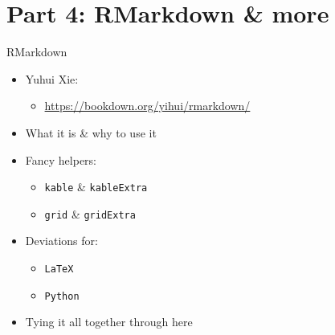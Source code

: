 \documentclass[
  ignorenonframetext,
]{beamer}
\providecommand{\tightlist}{%
  \setlength{\itemsep}{0pt}\setlength{\parskip}{0pt}}
\begin{document}
\hypertarget{part-4-rmarkdown-more}{%
\section{Part 4: RMarkdown \& more}\label{part-4-rmarkdown-more}}

\begin{frame}[fragile]{RMarkdown}
\protect\hypertarget{rmarkdown}{}

\begin{itemize}
\tightlist
\item
  Yuhui Xie:

  \begin{itemize}
  \tightlist
  \item
    \url{https://bookdown.org/yihui/rmarkdown/}
  \end{itemize}
\item
  What it is \& why to use it
\item
  Fancy helpers:

  \begin{itemize}
  \tightlist
  \item
    \texttt{kable} \& \texttt{kableExtra}
  \item
    \texttt{grid} \& \texttt{gridExtra}
  \end{itemize}
\item
  Deviations for:

  \begin{itemize}
  \tightlist
  \item
    \texttt{LaTeX}
  \item
    \texttt{Python}
  \end{itemize}
\item
  Tying it all together through here
\end{itemize}

\end{frame}
\end{document}
